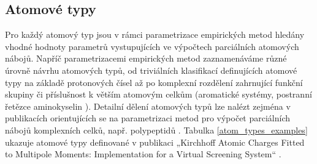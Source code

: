 





\subsection{Atomové typy}
Pro každý atomový typ jsou v rámci parametrizace empirických metod hledány vhodné hodnoty parametrů vystupujících ve výpočtech parciálních atomových nábojů. Napříč parametrizacemi empirických metod zaznamenáváme různé úrovně návrhu atomových typů, od triviálních klasifikací definujících atomové typy na základě protonových čísel \cite{sfkeem} až po komplexní rozdělení zahrnující funkční skupiny či příslušnost k větším atomovým celkům (aromatické systémy, postranní řetězce aminokyselin \cite{GDAC}). Detailní dělení atomových typů lze nalézt zejména v publikacích orientujících se na parametrizaci metod pro výpočet parciálních nábojů komplexních celků, např. polypeptidů \cite{attyp_peptides}. Tabulka \ref{atom_types_examples} ukazuje atomové typy definované v publikaci „Kirchhoff Atomic Charges Fitted to Multipole Moments: Implementation for a Virtual Screening System“ \cite{attyp2}.

